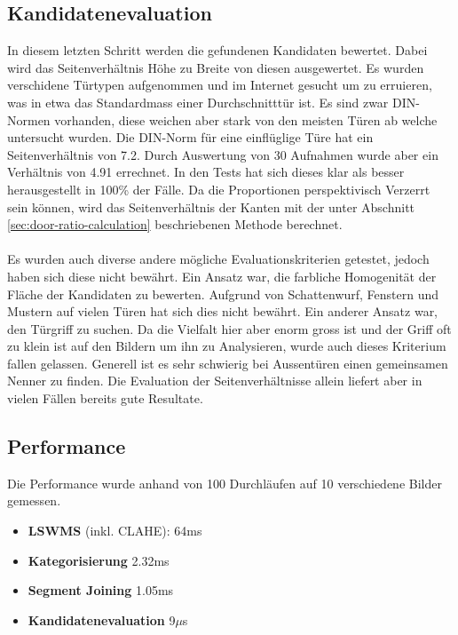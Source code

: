\subsection{Kandidatenevaluation}
In diesem letzten Schritt werden die gefundenen Kandidaten bewertet. Dabei wird das Seitenverhältnis Höhe zu Breite von diesen ausgewertet. Es wurden verschidene Türtypen aufgenommen und im Internet gesucht um zu erruieren, was in etwa das Standardmass einer Durchschnitttür ist. Es sind zwar DIN-Normen vorhanden, diese weichen aber stark von den meisten Türen ab welche untersucht wurden. Die DIN-Norm für eine einflüglige Türe hat ein Seitenverhältnis von 7.2. Durch Auswertung von 30 Aufnahmen wurde aber ein Verhältnis von 4.91 errechnet. In den Tests hat sich dieses klar als besser herausgestellt in 100\% der Fälle. Da die Proportionen perspektivisch Verzerrt sein können, wird das Seitenverhältnis der Kanten mit der unter Abschnitt \ref{sec:door-ratio-calculation} beschriebenen Methode berechnet.
\paragraph{}
Es wurden auch diverse andere mögliche Evaluationskriterien getestet, jedoch haben sich diese nicht bewährt. Ein Ansatz war, die farbliche Homogenität der Fläche der Kandidaten zu bewerten. Aufgrund von Schattenwurf, Fenstern und Mustern auf vielen Türen hat sich dies nicht bewährt. Ein anderer Ansatz war, den Türgriff zu suchen. Da die Vielfalt hier aber enorm gross ist und der Griff oft zu klein ist auf den Bildern um ihn zu Analysieren, wurde auch dieses Kriterium fallen gelassen. Generell ist es sehr schwierig bei Aussentüren einen gemeinsamen Nenner zu finden. Die Evaluation der Seitenverhältnisse allein liefert aber in vielen Fällen bereits gute Resultate.

\subsection{Performance}
Die Performance wurde anhand von 100 Durchläufen auf 10 verschiedene Bilder gemessen.

\begin{itemize}
	\item \textbf{LSWMS} (inkl. CLAHE): 64ms
	\item \textbf{Kategorisierung} 2.32ms
	\item \textbf{Segment Joining} 1.05ms
	\item \textbf{Kandidatenevaluation} 9$\mu$s
\end{itemize}

